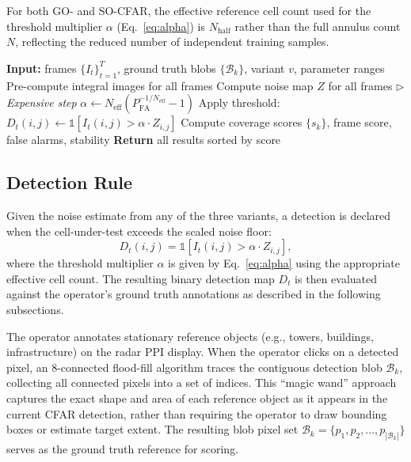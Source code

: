 \documentclass[conf]{new-aiaa}
\begin{document}
For both GO- and SO-CFAR, the effective reference cell count used for the threshold multiplier $\alpha$ (Eq.~\ref{eq:alpha}) is $N_{\mathrm{half}}$ rather than the full annulus count $N$, reflecting the reduced number of independent training samples.



\begin{algorithm}[t]
\caption{Grid Search with Loop Hoisting}
\label{alg:grid_search}
\begin{algorithmic}[1]
\STATE \textbf{Input:} frames $\{I_t\}_{t=1}^T$, ground truth blobs $\{\mathcal{B}_k\}$, variant $v$, parameter ranges
\STATE Pre-compute integral images for all frames
    \STATE Compute noise map $Z$ for all frames \hfill $\triangleright$ \emph{Expensive step}
        \STATE $\alpha \leftarrow N_{\mathrm{eff}}(P_{\mathrm{FA}}^{-1/N_{\mathrm{eff}}} - 1)$
        \STATE Apply threshold: $D_t(i,j) \leftarrow \mathbb{1}[I_t(i,j) > \alpha \cdot Z_{i,j}]$
        \STATE Compute coverage scores $\{s_k\}$, frame score, false alarms, stability
    \ENDFOR
\ENDFOR
\STATE \textbf{Return} all results sorted by score
\end{algorithmic}
\end{algorithm}


\subsection{Detection Rule}

Given the noise estimate from any of the three variants, a detection is declared when the cell-under-test exceeds the scaled noise floor:
\begin{equation}
    D_t(i,j) = \mathbb{1}\!\left[I_t(i,j) > \alpha \cdot Z_{i,j}\right], \label{eq:detection}
\end{equation}
where the threshold multiplier $\alpha$ is given by Eq.~\eqref{eq:alpha} using the appropriate effective cell count. The resulting binary detection map $D_t$ is then evaluated against the operator's ground truth annotations as described in the following subsections.

\label{sec:ground_truth}

The operator annotates stationary reference objects (e.g., towers, buildings, infrastructure) on the radar PPI display. When the operator clicks on a detected pixel, an 8-connected flood-fill algorithm traces the contiguous detection blob $\mathcal{B}_k$, collecting all connected pixels into a set of indices. This ``magic wand'' approach captures the exact shape and area of each reference object as it appears in the current CFAR detection, rather than requiring the operator to draw bounding boxes or estimate target extent. The resulting blob pixel set $\mathcal{B}_k = \{p_1, p_2, \dots, p_{|\mathcal{B}_k|}\}$ serves as the ground truth reference for scoring.
\end{document}
